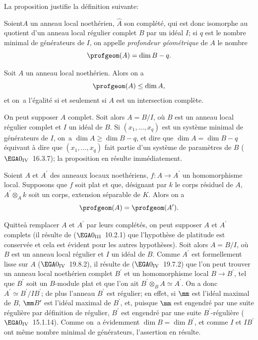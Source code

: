 La proposition  justifie la d\'efinition suivante:

\begin{definition} \label{XIV.5.3}
Soient\pageoriginale $A$ un anneau local noeth\'erien, $\widehat{A}$ son compl\'et\'e, qui est donc isomorphe au quotient d'un anneau local r\'egulier complet $B$ par un id\'eal $I$; si $q$ est le nombre minimal de g\'en\'erateurs de $I$, on appelle \emph{profondeur g\'eom\'etrique} de $A$ le nombre
$$
\profgeom(A)=\dim B-q.
$$
\end{definition}

\begin{proposition} \label{XIV.5.4} Soit $A$ un anneau local noeth\'erien. Alors on a
$$
\profgeom(A)\leq\dim A,
$$
et on~a l'\'egalit\'e si et seulement si $A$ est un intersection compl\`ete.
\end{proposition}

On peut supposer $A$ complet. Soit alors $A=B/I$, o\`u $B$ est un anneau local r\'egulier complet et $I$ un id\'eal de $B$. Si $(x_{1},\dots, x_{q})$ est un syst\`eme minimal de g\'en\'erateurs de $I$, on~a $\dim A\geq\dim B-q$, et dire que $\dim A=\dim B-q$ \'equivaut \`a dire que $(x_{1},\dots, x_{q})$ fait partie d'un syst\`eme de param\`etres de $B$ ($\EGA 0_{\textup{IV}}$~16.3.7); la proposition en r\'esulte imm\'ediatement.

\begin{proposition} \label{XIV.5.5} Soient $A$ et $A^{\prime}$ des anneaux locaux noeth\'eriens, $f\colon A\to A^{\prime}$ un homomorphisme local. Supposons que $f$ soit plat et que, d\'esignant par $k$ le corps r\'esiduel de $A$, $A^{\prime}\otimes_{A}k$ soit un corps, extension s\'eparable de $K$. Alors on a
$$
\profgeom(A)=\profgeom(A^{\prime}).
$$
\end{proposition}

Quitte\pageoriginale \`a remplacer $A$ et $A^{\prime}$ par leurs compl\'et\'es, on peut supposer $A$ et $A^{\prime}$ complets (il r\'esulte de ($\EGA 0_{\textup{III}}$~10.2.1) que l'hypoth\`ese de platitude est conserv\'ee et cela est \'evident pour les autres hypoth\`eses). Soit alors $A=B/I$, o\`u $B$ est un anneau local r\'egulier et $I$ un id\'eal de $B$. Comme $A^{\prime}$ est formellement lisse sur $A$ ($\EGA 0_{\textup{IV}}$~19.8.2), il r\'esulte de ($\EGA 0_{\textup{IV}}$~19.7.2) que l'on peut trouver un anneau local noeth\'erien complet $B^{\prime}$ et un homomorphisme local $B\to B^{\prime}$, tel que $B^{\prime}$ soit un $B$-module plat et que l'on ait $B^{\prime}\otimes_{B}A\simeq A^{\prime}$. On a donc $A^{\prime}\simeq B^{\prime}/IB^{\prime}$; de plus l'anneau $B^{\prime}$ est r\'egulier; en effet, si $\mm$ est l'id\'eal maximal de $B$, $\mm B^{\prime}$ est l'id\'eal maximal de $B^{\prime}$, et, puisque $\mm$ est engendr\'e par une suite r\'eguli\`ere par d\'efinition de \og r\'egulier\fg, $B^{\prime}$ est engendr\'e par une suite $B^{\prime}$-r\'eguli\`ere ($\EGA 0_{\textup{IV}}$~15.1.14). Comme on~a \'evidemment $\dim B=\dim B^{\prime}$, et comme $I$ et $IB^{\prime}$ ont m\^eme nombre minimal de g\'en\'erateurs, l'assertion en r\'esulte.

